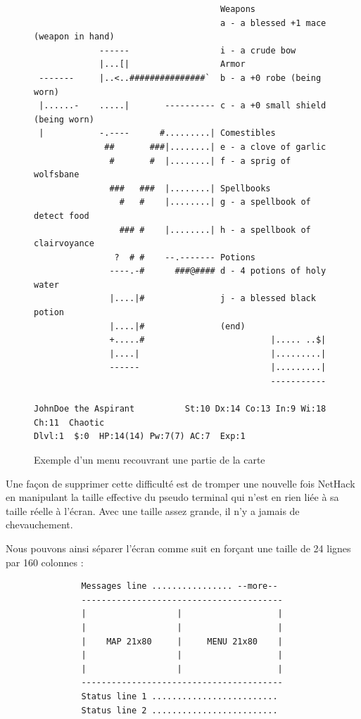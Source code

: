 \documentclass[a4paper,11pt]{article}
\begin{document}
\begin{figure}[H]
	\caption{Exemple d'un menu recouvrant une partie de la carte}
	\begin{verbatim}
                                     Weapons
                                     a - a blessed +1 mace (weapon in hand)
             ------                  i - a crude bow
             |...[|                  Armor
 -------     |..<..###############`  b - a +0 robe (being worn)
 |......-    .....|       ---------- c - a +0 small shield (being worn)
 |           -.----      #.........| Comestibles
              ##       ###|........| e - a clove of garlic
               #       #  |........| f - a sprig of wolfsbane
               ###   ###  |........| Spellbooks
                 #   #    |........| g - a spellbook of detect food
                 ### #    |........| h - a spellbook of clairvoyance
                ?  # #    --.------- Potions
               ----.-#      ###@#### d - 4 potions of holy water
               |....|#               j - a blessed black potion
               |....|#               (end) 
               +.....#                         |..... ..$|
               |....|                          |.........|
               ------                          |.........|
                                               -----------

JohnDoe the Aspirant          St:10 Dx:14 Co:13 In:9 Wi:18 Ch:11  Chaotic
Dlvl:1  $:0  HP:14(14) Pw:7(7) AC:7  Exp:1
	\end{verbatim}
\end{figure}

Une façon de supprimer cette difficulté est de tromper une nouvelle fois NetHack en manipulant la taille effective du pseudo terminal qui n'est en rien liée à sa taille réelle à l'écran. Avec une taille assez grande, il n'y a jamais de chevauchement.

Nous pouvons ainsi séparer l'écran comme suit en forçant une taille de 24 lignes par 160 colonnes :

\begin{verbatim}
               Messages line ................ --more--
               ----------------------------------------
               |                  |                   |
               |                  |                   |
               |    MAP 21x80     |     MENU 21x80    |
               |                  |                   |
               |                  |                   |
               ----------------------------------------
               Status line 1 .........................
               Status line 2 .........................
\end{verbatim}
\end{document}

